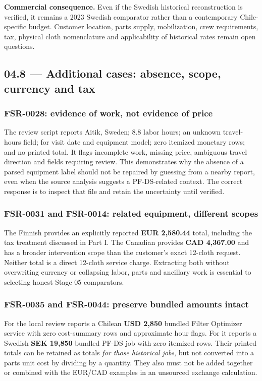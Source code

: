 \documentclass[11pt,a4paper]{article}
\DeclareRobustCommand{\code}[1]{{\ttfamily\small\detokenize{#1}}}
\begin{document}
\textbf{Commercial consequence.} Even if the Swedish historical reconstruction is verified, it remains a 2023 Swedish comparator rather than a contemporary Chile-specific budget. Customer location, parts supply, mobilization, crew requirements, tax, physical cloth nomenclature and applicability of historical rates remain open questions.

\subsection{04.8 --- Additional cases: absence, scope, currency and tax}
\subsubsection{FSR-0028: evidence of work, not evidence of price}
The review script reports Aitik, Sweden; \(8.8\) labor hours; an unknown travel-hours field; \code{None} for visit date and equipment model; zero itemized monetary rows; and no printed total. It flags incomplete work, missing price, ambiguous travel direction and fields requiring review. This demonstrates why the absence of a parsed equipment label should not be repaired by guessing from a nearby report, even when the source analysis suggests a PF-DS-related context. The correct response is to inspect that file and retain the uncertainty until verified.

\subsubsection{FSR-0031 and FSR-0014: related equipment, different scopes}
The Finnish \code{FSR-0031} provides an explicitly reported \textbf{EUR 2,580.44} total, including the tax treatment discussed in Part I. The Canadian \code{FSR-0014} provides \textbf{CAD 4,367.00} and has a broader intervention scope than the customer's exact 12-cloth request. Neither total is a direct 12-cloth service charge. Extracting both without overwriting currency or collapsing labor, parts and ancillary work is essential to selecting honest Stage 05 comparators.

\subsubsection{FSR-0035 and FSR-0044: preserve bundled amounts intact}
For \code{FSR-0035} the local review reports a Chilean \textbf{USD 2,850} bundled Filter Optimizer service with zero cost-summary rows and approximate hour flags. For \code{FSR-0044} it reports a Swedish \textbf{SEK 19,850} bundled PF-DS job with zero itemized rows. Their printed totals can be retained as totals \emph{for those historical jobs}, but not converted into a parts unit cost by dividing by a quantity. They also must not be added together or combined with the EUR/CAD examples in an unsourced exchange calculation.
\end{document}
